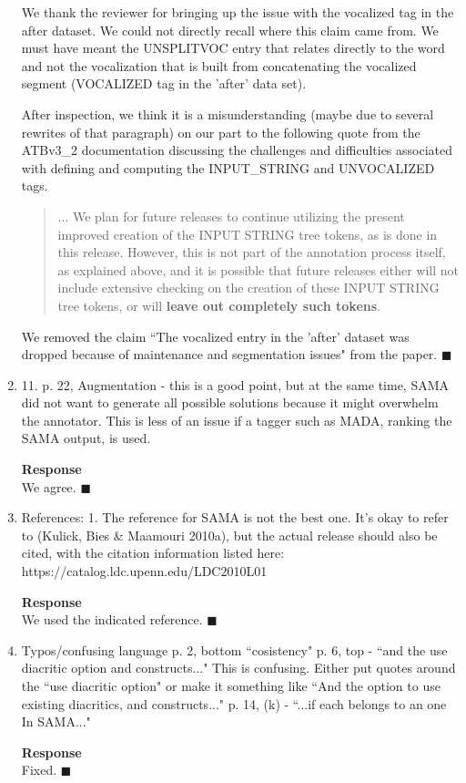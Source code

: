 \begin{enumerate}[leftmargin=0mm,label=\bfseries CommentR3.\arabic*]
We thank the reviewer for bringing up the issue with the vocalized tag in the after dataset. 
We could not directly recall where this claim came from. 
We must have meant the UNSPLITVOC entry that relates directly to the word and not the vocalization that is built
from concatenating the vocalized segment (VOCALIZED tag in the 'after' data set).

After inspection, we think it is a misunderstanding (maybe due to several rewrites of that paragraph) 
on our part to the following quote from the ATBv3\_2 documentation discussing the 
challenges and difficulties associated with defining and computing the INPUT\_STRING and UNVOCALIZED tags. 

\blockquote{
... We plan
for future releases to continue utilizing the present improved creation of the
INPUT STRING tree tokens, as is done in this release.  However, this is not 
part of the annotation process itself, as explained above, and it is possible 
that future releases either will not include extensive checking on the
creation of these INPUT STRING tree tokens, or will {\bf leave out completely
such tokens}.
}

We removed the claim ``The vocalized entry in the 'after' dataset was dropped because of maintenance and segmentation issues" 
from the paper.
$\blacksquare$

\item \label{Review.3.17}
11. p. 22, Augmentation - this is a good point, but at the same time, SAMA did not want to generate all possible solutions because it might overwhelm the annotator.  This is less of an issue if a tagger such as MADA, ranking the SAMA output, is used.

\textbf{Response}\\
We agree.
$\blacksquare$
\item \label{Review.3.18}
References:
1. The reference for SAMA is not the best one.  It's okay to refer to (Kulick, Bies \& Maamouri 2010a), but the actual release should also be cited, with the citation information listed here: https://catalog.ldc.upenn.edu/LDC2010L01

\textbf{Response}\\
We used the indicated reference. 
$\blacksquare$


\item \label{Review.3.19}
Typos/confusing language
p. 2, bottom ``cosistency"
p. 6, top - ``and the use diacritic option and constructs..."
This is confusing. Either put quotes around the ``use diacritic option" or make it something like ``And the option to use existing diacritics, and  constructs..."
p. 14, (k) - ``...if each belongs to an one In SAMA..."

\textbf{Response}\\
Fixed. 
$\blacksquare$

\end{enumerate}
